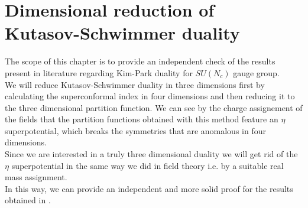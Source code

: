 

\chapter{Dimensional reduction of \\ Kutasov-Schwimmer duality}

The scope of this chapter is to provide an independent check of the results present in literature regarding Kim-Park duality for $SU(N_c)$ gauge group.\\
We will reduce Kutasov-Schwimmer duality in three dimensions first by calculating the superconformal index in four dimensions and then reducing it to the three dimensional partition function.
We can see by the charge assignement of the fields that the partition functions obtained with this method feature an $\eta$ superpotential, which breaks the symmetries that are anomalous in four dimensions.\\
Since we are interested in a truly three dimensional duality we will get rid of the $\eta$ superpotential in the same way we did in field theory i.e. by a suitable real mass assignment.\\
In this way, we can provide an independent and more solid proof for the results obtained in \cite{Nii:2014jsa}.


